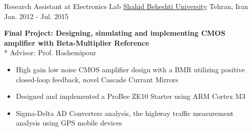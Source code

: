 \begin{cventries}
  \cventry
    {Research Assistant at Electronics Lab} %
    {\href{http://en.sbu.ac.ir/sitepages/home.aspx}{Shahid Beheshti University}} %
    {Tehran, Iran} %
    {Jan. 2012 - Jul. 2015} %
    {
      \begin{cvitems} %
        \item \textbf{Final Project: Designing, simulating and implementing CMOS amplifier with Beta-Multiplier
        Reference}
        \\*
        {\color{awesome} Advisor: Prof. Hashemipour}
        \begin{itemize}
        \item  High gain low noise CMOS amplifier design with a BMR utilizing positive closed-loop feedback, novel Cascade Currant Mirrors
        \item Designed and implemented a ProBee ZE10 Starter using ARM Cortex M3
		\item Sigma-Delta AD Converters analysis, the highway traffic measurement analysis using GPS mobile devices
		\end{itemize}
      \end{cvitems}
    }
\end{cventries}
